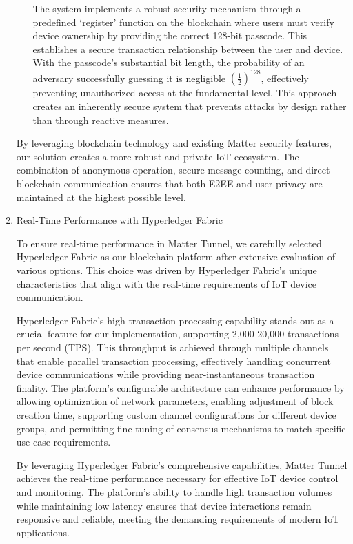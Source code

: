 \documentclass[conference]{IEEEtran}
\begin{document}
\begin{enumerate}[itemsep=2ex, parsep=1ex]
\begin{enumerate}[itemsep=2ex, parsep=1ex]
	      	      The system implements a robust security mechanism through a predefined `register' 
	      	      function on the blockchain where users must verify device ownership by providing 
	      	      the correct 128-bit passcode. This establishes a secure transaction relationship 
	      	      between the user and device. With the passcode's substantial bit length, the 
	      	      probability of an adversary successfully guessing it is negligible 
	      	      $\left(\frac{1}{2}\right)^{128}$, effectively preventing unauthorized access at the fundamental level. 
	      	      This approach creates an inherently secure system that prevents attacks 
	      	      by design rather than through reactive measures.
	      \end{enumerate}
	      	      	      
	      By leveraging blockchain technology and existing Matter security features,
	      our solution creates a more robust and private IoT ecosystem. The combination
	      of anonymous operation, secure message counting, and direct blockchain communication
	      ensures that both E2EE and user privacy are maintained at the highest possible
	      level.
	      	      	      
	\item Real-Time Performance with Hyperledger Fabric
	      	      	      
	      To ensure real-time performance in Matter Tunnel, we carefully selected Hyperledger
	      Fabric as our blockchain platform after extensive evaluation of various options.
	      This choice was driven by Hyperledger Fabric's unique characteristics that
	      align with the real-time requirements of IoT device communication.
	      	      	      
	      Hyperledger Fabric's high transaction processing capability stands out as
	      a crucial feature for our implementation, supporting 2,000-20,000 transactions
	      per second (TPS). This throughput is achieved through multiple channels
	      that enable parallel transaction processing, effectively handling concurrent
	      device communications while providing near-instantaneous transaction finality.
	      The platform's configurable architecture can enhance performance by
	      allowing optimization of network parameters, enabling adjustment of block creation
	      time, supporting custom channel configurations for different device groups,
	      and permitting fine-tuning of consensus mechanisms to match specific use case
	      requirements.
	      	      	      
	      By leveraging Hyperledger Fabric's comprehensive capabilities, Matter
	      Tunnel achieves the real-time performance necessary for effective IoT
	      device control and monitoring. The platform's ability to handle high transaction
	      volumes while maintaining low latency ensures that device interactions remain
	      responsive and reliable, meeting the demanding requirements of modern IoT
	      applications.
\end{enumerate}
\end{document}

